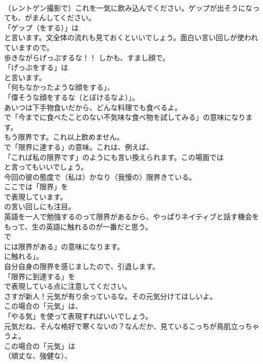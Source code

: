 \documentclass[8pt]{extreport}
\begin{document}
\begin{CJK}{UTF8}{min}
\\	（レントゲン撮影で）これを一気に飲み込んでください。ゲップが出そうになっても、がまんしてください。 
\\	「ゲップ（をする）」は
\\	と言います。文全体の流れも見ておくといいでしょう。面白い言い回しが使われていますので。	
\\	歩きながらげっぷするな！！ しかも、すまし顔で。 
\\	「げっぷをする」は
\\	と言います。
\\	「何もなかったような顔をする」、
\\	「偉そうな顔をするな（とぼけるなよ）」。	
\\	あいつは下手物食いだから、どんな料理でも食べるよ。 
\\	で「今までに食べたことのない不気味な食べ物を試してみる」の意味になります。	
\\	もう限界です。これ以上飲めません。 
\\	で「限界に達する」の意味。これは、例えば、
\\	「これば私の限界です」のようにも言い換えられます。この場面では
\\	と言ってもいいでしょう。	
\\	今回の彼の態度で（私は）かなり（我慢の）限界きている。 
\\	ここでは「限界」を
\\	で表現しています。
\\	の言い回しにも注目。	
\\	英語を一人で勉強するのって限界があるから、やっぱりネイティブと話す機会をもって、生の英語に触れるのが一番だと思う。 
\\	で
\\	には限界がある」の意味になります。
\\	に触れる」。	
\\	自分自身の限界を感じましたので、引退します。 
\\	「限界に到達する」を
\\	で表現している点に注意してください。	
\\	さすが新人！元気が有り余っているな。その元気分けてほしいよ。 
\\	この場合の「元気」は、
\\	「やる気」を使って表現すればいいでしょう。	
\\	元気だね、そんな格好で寒くないの？なんだか、見ているこっちが鳥肌立っちゃうよ。 
\\	この場合の「元気」は
\\	（頑丈な、強健な）、

\end{CJK}
\end{document}
